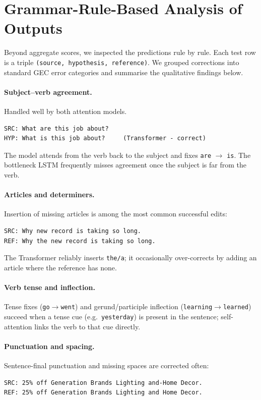 \documentclass[11pt,a4paper]{article}
\begin{document}
\section{Grammar-Rule-Based Analysis of Outputs}
Beyond aggregate scores, we inspected the predictions rule by rule. Each test
row is a triple \texttt{(source, hypothesis, reference)}. We grouped corrections
into standard GEC error categories and summarise the qualitative findings below.

\paragraph{Subject--verb agreement.}
Handled well by both attention models.
\begin{lstlisting}
SRC: What are this job about?
HYP: What is this job about?     (Transformer - correct)
\end{lstlisting}
The model attends from the verb back to the subject and fixes \texttt{are}
$\rightarrow$ \texttt{is}. The bottleneck LSTM frequently misses agreement once
the subject is far from the verb.

\paragraph{Articles and determiners.}
Insertion of missing articles is among the most common successful edits:
\begin{lstlisting}
SRC: Why new record is taking so long.
REF: Why the new record is taking so long.
\end{lstlisting}
The Transformer reliably inserts \texttt{the/a}; it occasionally over-corrects
by adding an article where the reference has none.

\paragraph{Verb tense and inflection.}
Tense fixes (\texttt{go}$\rightarrow$\texttt{went}) and gerund/participle
inflection (\texttt{learning}$\rightarrow$\texttt{learned}) succeed when a tense
cue (e.g.\ \texttt{yesterday}) is present in the sentence; self-attention links
the verb to that cue directly.

\paragraph{Punctuation and spacing.}
Sentence-final punctuation and missing spaces are corrected often:
\begin{lstlisting}
SRC: 25% off Generation Brands Lighting and-Home Decor.
REF: 25% off Generation Brands Lighting and Home Decor.
\end{lstlisting}
\end{document}

